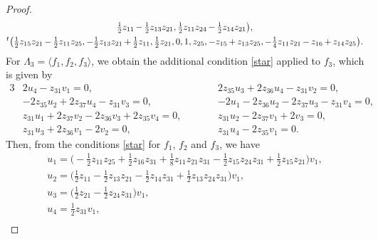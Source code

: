 \begin{proof}
\begin{gather*}
\tfrac{1}{2}z_{11}\hspace{-0.6pt}-\hspace{-0.6pt} \tfrac{1}{2}z_{13}z_{21}, \tfrac{1}{2}z_{11}z_{24} \hspace{-0.6pt}-\hspace{-0.6pt} \tfrac{1}{2}z_{14}z_{21}\bigr),
\\
{}^t\bigl(\tfrac{1}{2}z_{15}z_{21} \hspace{-0.6pt}-\hspace{-0.6pt} \tfrac{1}{2}z_{11}z_{25}, - \tfrac{1}{2}z_{13}z_{21} \hspace{-0.6pt}+\hspace{-0.6pt} \tfrac{1}{2}z_{11},
\tfrac{1}{2}z_{21}, 0, 1, z_{25}, - z_{15} \hspace{-0.6pt}+\hspace{-0.6pt} z_{13}z_{25}, -\tfrac{1}{4}z_{11}z_{21} \hspace{-0.6pt}-\hspace{-0.6pt} z_{16} \hspace{-0.6pt}+\hspace{-0.6pt} z_{14}z_{25}\bigr).
\end{gather*}
For $\Lambda_3 = \langle f_1, f_2, f_3\rangle$, we obtain the additional condition \eqref{star} applied to $f_3$,
which is given by
\begin{alignat*}{3}
&2u_4 - z_{31}v_1 = 0,
\qquad&&
2z_{35}u_3 + 2z_{36}u_4 - z_{31}v_2 = 0,&
\\
&-2 z_{35}u_2 + 2z_{37}u_4 - z_{31}v_3 = 0,
\qquad&&
-2u_1 - 2z_{36}u_2 - 2z_{37}u_3 - z_{31}v_4 = 0,&
\\
&z_{31}u_1 + 2z_{37}v_2 - 2z_{36}v_3 + 2z_{35}v_4 = 0,
\qquad&&
z_{31}u_2 - 2z_{37}v_1 + 2v_3 = 0,&
\\
&z_{31}u_3 + 2z_{36}v_1 - 2v_2 = 0,
\qquad&&
z_{31}u_4 - 2z_{35}v_1 = 0.&
\end{alignat*}
Then, from the conditions \eqref{star} for $f_1$, $f_2$ and $f_3$, we have
\begin{gather*}
u_1 = \biggl(- \frac{1}{2}z_{11}z_{25} + \frac{1}{2}z_{16}z_{31} + \frac{1}{8}z_{11}z_{21}z_{31}
- \frac{1}{2}z_{15}z_{24}z_{31} + \frac{1}{2}z_{15}z_{21}\biggr)v_1,
\\
u_2 = \biggl(\frac{1}{2}z_{11} - \frac{1}{2}z_{13}z_{21} - \frac{1}{2}z_{14}z_{31} + \frac{1}{2}z_{13}z_{24}z_{31}\biggr)v_1,
\\
u_3 = \biggl(\frac{1}{2}z_{21} - \frac{1}{2}z_{24}z_{31}\biggr)v_1,
\\
u_4 = \frac{1}{2}z_{31}v_1,
\\

\end{gather*}
\end{proof}

